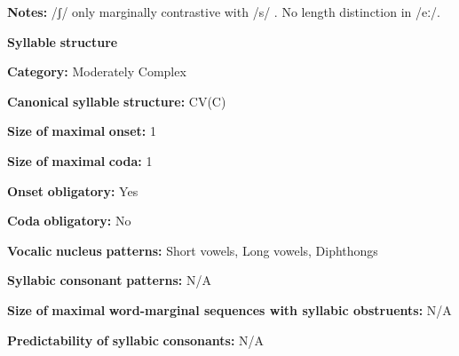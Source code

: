 \documentclass[output=paper]{langsci/langscibook}
\begin{document}
\begin{styleBody}
\textbf{Notes:} /ʃ/ only marginally contrastive with /s/ \citep[17]{Bright1957}. No length distinction in /eː/.
\end{styleBody}

\begin{styleBody}
\textbf{Syllable} \textbf{structure}
\end{styleBody}

\begin{styleBody}
\textbf{Category:} Moderately Complex
\end{styleBody}

\begin{styleBody}
\textbf{Canonical} \textbf{syllable} \textbf{structure:} CV(C) \citep[11]{Bright1957}
\end{styleBody}

\begin{styleBody}
\textbf{Size} \textbf{of} \textbf{maximal} \textbf{onset:} 1
\end{styleBody}

\begin{styleBody}
\textbf{Size} \textbf{of} \textbf{maximal} \textbf{coda:} 1
\end{styleBody}

\begin{styleBody}
\textbf{Onset} \textbf{obligatory:} Yes
\end{styleBody}

\begin{styleBody}
\textbf{Coda} \textbf{obligatory:} No
\end{styleBody}

\begin{styleBody}
\textbf{Vocalic} \textbf{nucleus} \textbf{patterns:} Short vowels, Long vowels, Diphthongs
\end{styleBody}

\begin{styleBody}
\textbf{Syllabic} \textbf{consonant} \textbf{patterns:} N/A
\end{styleBody}

\begin{styleBody}
\textbf{Size} \textbf{of} \textbf{maximal} \textbf{word{}-marginal sequences with syllabic obstruents:} N/A
\end{styleBody}

\begin{styleBody}
\textbf{Predictability} \textbf{of} \textbf{syllabic} \textbf{consonants:} N/A
\end{styleBody}
\end{document}
